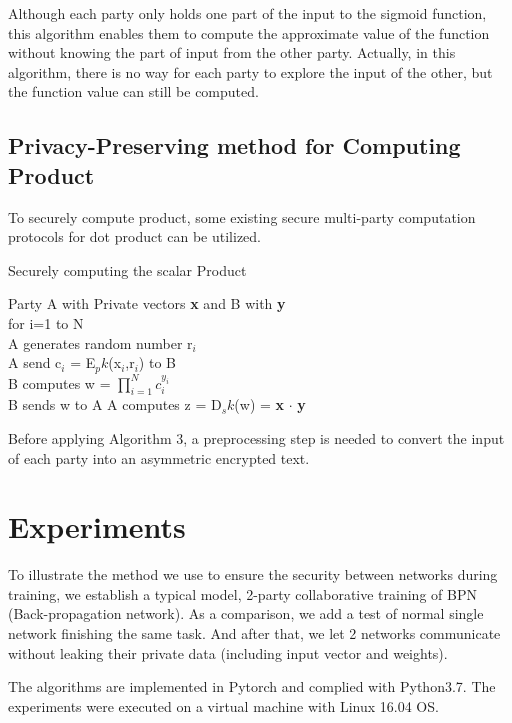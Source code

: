 \documentclass[twoside,twocolumn]{article}
\begin{document}
Although each party only holds one part of the input to the sigmoid function, this algorithm enables them to compute the approximate value of the function without knowing the part of input from the other party. Actually, in this algorithm, there is no way for each party to explore the input of the other, but the function value can still be computed.

\subsection{Privacy-Preserving method for Computing Product}
To securely compute product, some existing secure multi-party computation protocols for dot product can be utilized.

\newpage

\begin{algorithm}
	\caption{Securely computing the scalar Product}
	\begin{flushleft}
		
	Party A with Private vectors {\bfseries x} and B with {\bfseries y}\\
	for i=1 to N\\
	\quad A generates random number r$_i$\\
	\quad A send c$_i$ = E$_pk$(x$_i$,r$_i$) to B\\
	B computes w = 	$\prod_{i=1}^N c^{y_i}_i$\\
	B sends w to A
	A computes z = D$_sk$(w) = {\bfseries x} $\cdot$ {\bfseries y}
	
	\end{flushleft}
	
\end{algorithm}
Before applying Algorithm 3, a preprocessing step is needed to convert the input of each party into an asymmetric encrypted text.

\section{Experiments}
To illustrate the method we use to ensure the security between networks during training, we 
establish a typical model, 2-party collaborative training of BPN (Back-propagation network).
As a comparison, we add a test of normal single network finishing the same task. And after that, we let 2 networks communicate without leaking their private data (including input vector and weights).

The algorithms are implemented in Pytorch and complied with Python3.7. The experiments were executed on a virtual machine with Linux 16.04 OS.
\end{document}
